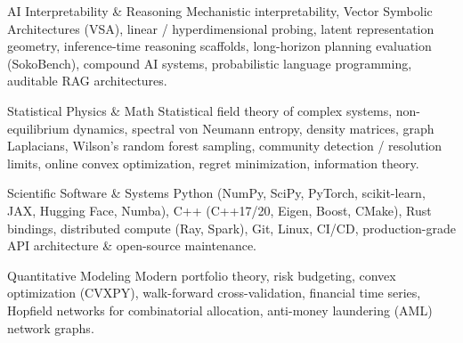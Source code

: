 \documentclass[11pt, a4paper]{awesome-cv}
\begin{document}



\begin{cvskills}

\cvskill
{AI Interpretability \& Reasoning} {Mechanistic interpretability, Vector Symbolic Architectures (VSA), linear / hyperdimensional probing, latent representation geometry, inference-time reasoning scaffolds, long-horizon planning evaluation (SokoBench), compound AI systems, probabilistic language programming, auditable RAG architectures.} 

\cvskill
{Statistical Physics \& Math} {Statistical field theory of complex systems, non-equilibrium dynamics, spectral von Neumann entropy, density matrices, graph Laplacians, Wilson's random forest sampling, community detection / resolution limits, online convex optimization, regret minimization, information theory.} 

\cvskill
{Scientific Software \& Systems} {Python (NumPy, SciPy, PyTorch, scikit-learn, JAX, Hugging Face, Numba), C++ (C++17/20, Eigen, Boost, CMake), Rust bindings, distributed compute (Ray, Spark), Git, Linux, CI/CD, production-grade API architecture \& open-source maintenance.} 

\cvskill
{Quantitative Modeling} {Modern portfolio theory, risk budgeting, convex optimization (CVXPY), walk-forward cross-validation, financial time series, Hopfield networks for combinatorial allocation, anti-money laundering (AML) network graphs.} 

\end{cvskills} 

\end{document}
